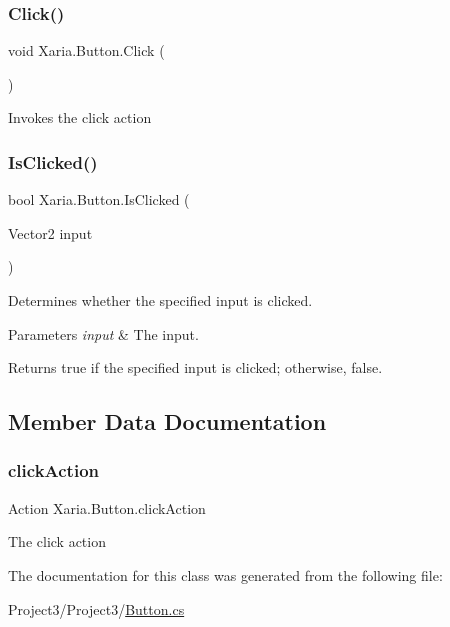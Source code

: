 \subsubsection{\texorpdfstring{Click()}{Click()}}
{\footnotesize\ttfamily void Xaria.\+Button.\+Click (\begin{DoxyParamCaption}{ }\end{DoxyParamCaption})\hspace{0.3cm}{\ttfamily [inline]}}



Invokes the click action 

\mbox{\label{classXaria_1_1Button_a28b79628de3274d34fd14f159d84a4d3}} 
\subsubsection{\texorpdfstring{Is\+Clicked()}{IsClicked()}}
{\footnotesize\ttfamily bool Xaria.\+Button.\+Is\+Clicked (\begin{DoxyParamCaption}\item[{Vector2}]{input }\end{DoxyParamCaption})\hspace{0.3cm}{\ttfamily [inline]}}



Determines whether the specified input is clicked. 


\begin{DoxyParams}{Parameters}
{\em input} & The input.\\
\hline
\end{DoxyParams}
\begin{DoxyReturn}{Returns}
{\ttfamily true} if the specified input is clicked; otherwise, {\ttfamily false}. 
\end{DoxyReturn}


\subsection{Member Data Documentation}
\mbox{\label{classXaria_1_1Button_adbeeb3818c76acb80a43342fc24f1f0f}} 
\subsubsection{\texorpdfstring{click\+Action}{clickAction}}
{\footnotesize\ttfamily Action Xaria.\+Button.\+click\+Action\hspace{0.3cm}{\ttfamily [private]}}



The click action 



The documentation for this class was generated from the following file\+:\begin{DoxyCompactItemize}
\item 
Project3/\+Project3/\hyperlink{Button_8cs}{Button.\+cs}\end{DoxyCompactItemize}

